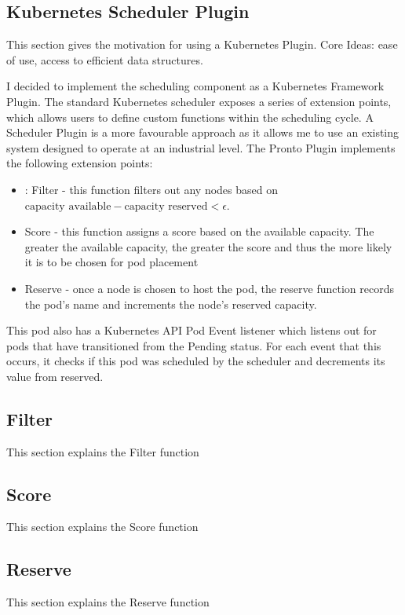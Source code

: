 \subsection{Kubernetes Scheduler Plugin}
This section gives the motivation for using a Kubernetes Plugin. Core Ideas:
ease of use, access to efficient data structures.

I decided to implement the scheduling component as a Kubernetes Framework
Plugin. The standard Kubernetes scheduler exposes a series of extension points,
which allows users to define custom functions within the scheduling cycle. A
Scheduler Plugin is a more favourable approach as it allows me to use an
existing system designed to operate at an industrial level. The Pronto Plugin
implements the following extension points:
\begin{itemize}
    \item: Filter - this function filters out any nodes based on $
        \text{capacity available} - \text{capacity reserved} < \epsilon$.
    \item Score - this function assigns a score based on the available capacity.
        The greater the available capacity, the greater the score and thus the
        more likely it is to be chosen for pod placement
    \item Reserve - once a node is chosen to host the pod, the reserve function
        records the pod's name and increments the node's reserved capacity.
\end{itemize}

This pod also has a Kubernetes API Pod Event listener which listens out for pods
that have transitioned from the Pending status. For each event that this occurs,
it checks if this pod was scheduled by the scheduler and decrements its value
from reserved.


\subsection{Filter}
This section explains the Filter function

\subsection{Score}
This section explains the Score function

\subsection{Reserve}
This section explains the Reserve function
